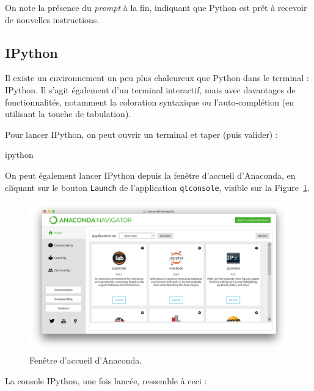\documentclass[
  12pt,
]{book}
\newenvironment{Shaded}{\begin{snugshade}}{\end{snugshade}}
\newcommand{\NormalTok}[1]{#1}
\numberwithin{equation}{section}
\numberwithin{countremarque}{section}
\begin{document}
On note la présence du \emph{prompt} à la fin, indiquant que Python est prêt à recevoir de nouvelles instructions.

\subsection{IPython}\label{ipython}

Il existe un environnement un peu plus chaleureux que Python dans le terminal : IPython. Il s'agit également d'un terminal interactif, mais avec davantages de fonctionnalités, notamment la coloration syntaxique ou l'auto-complétion (en utilisant la touche de tabulation).

Pour lancer IPython, on peut ouvrir un terminal et taper (puis valider) :

\begin{Shaded}
\begin{Highlighting}[]
\NormalTok{ipython}
\end{Highlighting}
\end{Shaded}

On peut également lancer IPython depuis la fenêtre d'accueil d'Anaconda, en cliquant sur le bouton \texttt{Launch} de l'application \texttt{qtconsole}, visible sur la Figure~\ref{fig:intro-anaconda-navigator}.

\begin{figure}[H]

{\centering \includegraphics[width=1\linewidth]{figs/anaconda_navigator} 

}

\caption{Fenêtre d'accueil d'Anaconda.}\label{fig:intro-anaconda-navigator}
\end{figure}

La console IPython, une fois lancée, ressemble à ceci :
\end{document}
